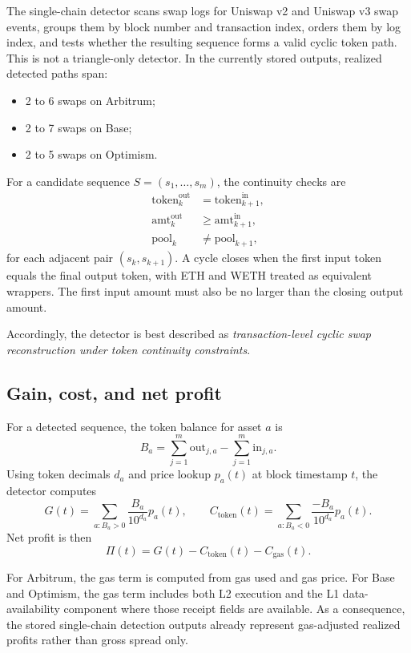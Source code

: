 \documentclass[11pt]{article}
\begin{document}
The single-chain detector scans swap logs for Uniswap v2 and Uniswap v3 swap events, groups them by block number and transaction index, orders them by log index, and tests whether the resulting sequence forms a valid cyclic token path. This is not a triangle-only detector. In the currently stored outputs, realized detected paths span:
\begin{itemize}[leftmargin=1.5em]
    \item 2 to 6 swaps on Arbitrum;
    \item 2 to 7 swaps on Base;
    \item 2 to 5 swaps on Optimism.
\end{itemize}

For a candidate sequence \(S=(s_1,\dots,s_m)\), the continuity checks are
\begin{align}
\mathrm{token}^{\mathrm{out}}_k &= \mathrm{token}^{\mathrm{in}}_{k+1}, \\
\mathrm{amt}^{\mathrm{out}}_k &\ge \mathrm{amt}^{\mathrm{in}}_{k+1}, \\
\mathrm{pool}_k &\neq \mathrm{pool}_{k+1},
\end{align}
for each adjacent pair \((s_k,s_{k+1})\). A cycle closes when the first input token equals the final output token, with ETH and WETH treated as equivalent wrappers. The first input amount must also be no larger than the closing output amount.

Accordingly, the detector is best described as \emph{transaction-level cyclic swap reconstruction under token continuity constraints}.

\subsection{Gain, cost, and net profit}

For a detected sequence, the token balance for asset \(a\) is
\[
B_a = \sum_{j=1}^{m} \mathrm{out}_{j,a} - \sum_{j=1}^{m} \mathrm{in}_{j,a}.
\]
Using token decimals \(d_a\) and price lookup \(p_a(t)\) at block timestamp \(t\), the detector computes
\[
G(t)=\sum_{a:B_a>0}\frac{B_a}{10^{d_a}}p_a(t),
\qquad
C_{\mathrm{token}}(t)=\sum_{a:B_a<0}\frac{-B_a}{10^{d_a}}p_a(t).
\]
Net profit is then
\[
\Pi(t)=G(t)-C_{\mathrm{token}}(t)-C_{\mathrm{gas}}(t).
\]

For Arbitrum, the gas term is computed from gas used and gas price. For Base and Optimism, the gas term includes both L2 execution and the L1 data-availability component where those receipt fields are available. As a consequence, the stored single-chain detection outputs already represent gas-adjusted realized profits rather than gross spread only.
\end{document}
